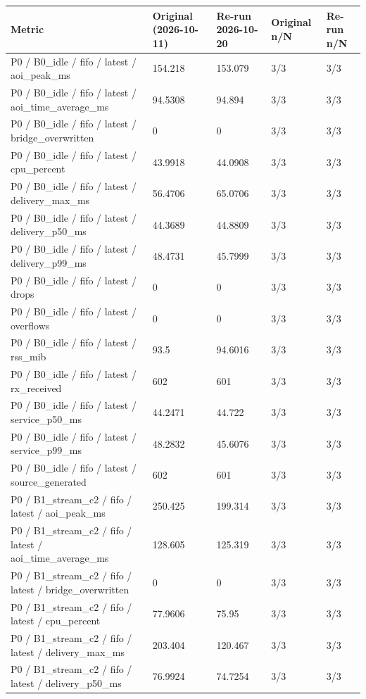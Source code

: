 \begin{tabular}{@{}lllll@{}}
\toprule
Metric & Original (2026-10-11) & Re-run 2026-10-20 & Original n/N & Re-run n/N \\
\midrule
P0 / B0\_idle / fifo / latest / aoi\_peak\_ms & 154.218 & 153.079 & 3/3 & 3/3 \\
P0 / B0\_idle / fifo / latest / aoi\_time\_average\_ms & 94.5308 & 94.894 & 3/3 & 3/3 \\
P0 / B0\_idle / fifo / latest / bridge\_overwritten & 0 & 0 & 3/3 & 3/3 \\
P0 / B0\_idle / fifo / latest / cpu\_percent & 43.9918 & 44.0908 & 3/3 & 3/3 \\
P0 / B0\_idle / fifo / latest / delivery\_max\_ms & 56.4706 & 65.0706 & 3/3 & 3/3 \\
P0 / B0\_idle / fifo / latest / delivery\_p50\_ms & 44.3689 & 44.8809 & 3/3 & 3/3 \\
P0 / B0\_idle / fifo / latest / delivery\_p99\_ms & 48.4731 & 45.7999 & 3/3 & 3/3 \\
P0 / B0\_idle / fifo / latest / drops & 0 & 0 & 3/3 & 3/3 \\
P0 / B0\_idle / fifo / latest / overflows & 0 & 0 & 3/3 & 3/3 \\
P0 / B0\_idle / fifo / latest / rss\_mib & 93.5 & 94.6016 & 3/3 & 3/3 \\
P0 / B0\_idle / fifo / latest / rx\_received & 602 & 601 & 3/3 & 3/3 \\
P0 / B0\_idle / fifo / latest / service\_p50\_ms & 44.2471 & 44.722 & 3/3 & 3/3 \\
P0 / B0\_idle / fifo / latest / service\_p99\_ms & 48.2832 & 45.6076 & 3/3 & 3/3 \\
P0 / B0\_idle / fifo / latest / source\_generated & 602 & 601 & 3/3 & 3/3 \\
P0 / B1\_stream\_c2 / fifo / latest / aoi\_peak\_ms & 250.425 & 199.314 & 3/3 & 3/3 \\
P0 / B1\_stream\_c2 / fifo / latest / aoi\_time\_average\_ms & 128.605 & 125.319 & 3/3 & 3/3 \\
P0 / B1\_stream\_c2 / fifo / latest / bridge\_overwritten & 0 & 0 & 3/3 & 3/3 \\
P0 / B1\_stream\_c2 / fifo / latest / cpu\_percent & 77.9606 & 75.95 & 3/3 & 3/3 \\
P0 / B1\_stream\_c2 / fifo / latest / delivery\_max\_ms & 203.404 & 120.467 & 3/3 & 3/3 \\
P0 / B1\_stream\_c2 / fifo / latest / delivery\_p50\_ms & 76.9924 & 74.7254 & 3/3 & 3/3 \\

\end{tabular}
